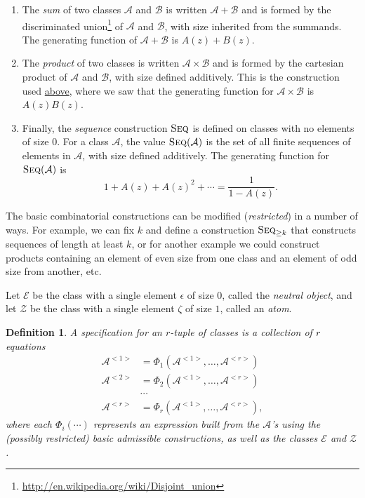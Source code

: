 \documentclass[12pt]{article}
\theoremstyle{plain}
\newtheorem{defin}{Definition}
\begin{document}
\begin{enumerate}
\item The \emph{sum} of two classes \(\mathcal{A}\) and \(\mathcal{B}\) is written \( \mathcal{A} + \mathcal{B} \) and is formed by the discriminated union\footnote{
 \url{http://en.wikipedia.org/wiki/Disjoint\_union}
}
of \( \mathcal{A} \) and \( \mathcal{B} \), with size inherited from the summands.
The generating function of \( \mathcal{A} + \mathcal{B} \) is \(A(z) + B(z) \).

\item The \emph{product} of two classes is written \( \mathcal{A} \times \mathcal{B} \) and is formed by the cartesian product of \( \mathcal{A} \) and \( \mathcal{B} \), with size defined additively.  This is the construction used \hyperref[sec:symboliccombinatoricsbackground]{above}, where we saw that the generating function for \( \mathcal{A} \times \mathcal{B} \) is \(A(z)B(z)\).

\item Finally, the \emph{sequence} construction \( \textsc{Seq} \) is defined on classes with no elements of size \(0\).
For a class \( \mathcal{A} \), the value \( \textsc{Seq}( \mathcal{A}) \) is the set of all finite sequences of elements in \( \mathcal{A} \), with size defined additively.  The generating function for  \( \textsc{Seq}( \mathcal{A}) \)  is
\[ 1 + A(z) + A(z)^2 + \cdots = \frac{1}{1-A(z)}. \]
\end{enumerate}

The basic combinatorial constructions can be modified (\emph{restricted}) in a number of ways.
For example, we can fix \(k\) and define a construction \( \textsc{Seq}_{ \geq k} \) that constructs sequences of length at least \(k\),
or for another example we could construct products containing an element of even size from one class and an element of odd size from another, etc.

Let \( \mathcal{E} \) be the class with a single element \(\epsilon\) of size \(0 \),
called the \emph{neutral object},
and let \(\mathcal{Z}\) be the class with a single element \( \zeta \) of size \(1\),
called an \emph{atom}.

\begin{defin}
A \emph{specification} for an \(r\)-tuple of classes is a collection of \(r\) equations
\begin{align*}
\mathcal{A}^{<1>} &= \Phi_1(\mathcal{A}^{<1>}, \dots, \mathcal{A}^{<r>}) \\
\mathcal{A}^{<2>} &= \Phi_2(\mathcal{A}^{<1>}, \dots, \mathcal{A}^{<r>}) \\
&\cdots \\
\mathcal{A}^{<r>} &= \Phi_r(\mathcal{A}^{<1>}, \dots, \mathcal{A}^{<r>}),
\end{align*}
where each \(\Phi_i(\cdots)\) represents an expression built from the \(\mathcal{A}\)'s using the (possibly restricted) basic admissible constructions, as well as the classes \(\mathcal{E}\) and \(\mathcal{Z}\).
\end{defin}
\end{document}
